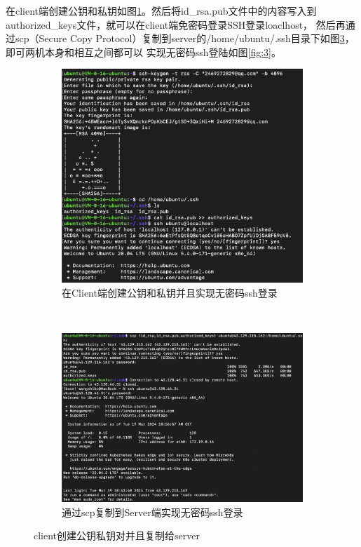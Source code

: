 \documentclass{article}
\begin{document}
在client端创建公钥和私钥如图\ref{fig:1}。然后将id\_rsa.pub文件中的内容写入到authorized\_keys文件，就可以在client端免密码登录SSH登录loaclhost，
然后再通过scp（Secure Copy Protocol）复制到server的/home/ubuntu/.ssh目录下如图\ref{fig:2}，即可两机本身和相互之间都可以
实现无密码ssh登陆如图\ref{fig:3}。
\begin{figure}[ht]
    \centering
    \begin{subfigure}[b]{0.4\textwidth} 
        \centering
        \includegraphics[width=\textwidth]{client_login_ssh.png} 
        \caption{在Client端创建公钥和私钥并且实现无密码ssh登录}
        \label{fig:1}
    \end{subfigure}
    ~
    \begin{subfigure}[b]{0.4\textwidth}
        \centering
        \includegraphics[width=\textwidth]{scp_ssh_without_pwd.png}
        \caption{通过scp复制到Server端实现无密码ssh登录}
        \label{fig:2}
    \end{subfigure}
    \caption{client创建公钥私钥对并且复制给server}
\end{figure}
\end{document}
